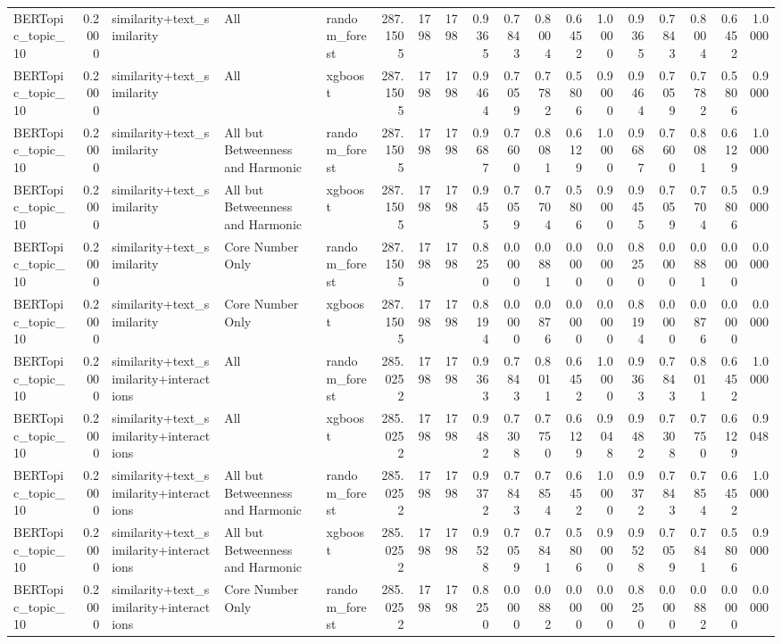 \begin{tabular}{lrlllrrrrrrrrrrrrr}
BERTopic_topic_10 & 0.2000 & similarity+text_similarity & All & random_forest & 287.1505 & 1798 & 1798 & 0.9365 & 0.7843 & 0.8004 & 0.6452 & 1.0000 & 0.9365 & 0.7843 & 0.8004 & 0.6452 & 1.0000 \\
BERTopic_topic_10 & 0.2000 & similarity+text_similarity & All & xgboost & 287.1505 & 1798 & 1798 & 0.9464 & 0.7059 & 0.7782 & 0.5806 & 0.9000 & 0.9464 & 0.7059 & 0.7782 & 0.5806 & 0.9000 \\
BERTopic_topic_10 & 0.2000 & similarity+text_similarity & All but Betweenness and Harmonic & random_forest & 287.1505 & 1798 & 1798 & 0.9687 & 0.7600 & 0.8081 & 0.6129 & 1.0000 & 0.9687 & 0.7600 & 0.8081 & 0.6129 & 1.0000 \\
BERTopic_topic_10 & 0.2000 & similarity+text_similarity & All but Betweenness and Harmonic & xgboost & 287.1505 & 1798 & 1798 & 0.9455 & 0.7059 & 0.7704 & 0.5806 & 0.9000 & 0.9455 & 0.7059 & 0.7704 & 0.5806 & 0.9000 \\
BERTopic_topic_10 & 0.2000 & similarity+text_similarity & Core Number Only & random_forest & 287.1505 & 1798 & 1798 & 0.8250 & 0.0000 & 0.0881 & 0.0000 & 0.0000 & 0.8250 & 0.0000 & 0.0881 & 0.0000 & 0.0000 \\
BERTopic_topic_10 & 0.2000 & similarity+text_similarity & Core Number Only & xgboost & 287.1505 & 1798 & 1798 & 0.8194 & 0.0000 & 0.0876 & 0.0000 & 0.0000 & 0.8194 & 0.0000 & 0.0876 & 0.0000 & 0.0000 \\
BERTopic_topic_10 & 0.2000 & similarity+text_similarity+interactions & All & random_forest & 285.0252 & 1798 & 1798 & 0.9363 & 0.7843 & 0.8011 & 0.6452 & 1.0000 & 0.9363 & 0.7843 & 0.8011 & 0.6452 & 1.0000 \\
BERTopic_topic_10 & 0.2000 & similarity+text_similarity+interactions & All & xgboost & 285.0252 & 1798 & 1798 & 0.9482 & 0.7308 & 0.7750 & 0.6129 & 0.9048 & 0.9482 & 0.7308 & 0.7750 & 0.6129 & 0.9048 \\
BERTopic_topic_10 & 0.2000 & similarity+text_similarity+interactions & All but Betweenness and Harmonic & random_forest & 285.0252 & 1798 & 1798 & 0.9372 & 0.7843 & 0.7854 & 0.6452 & 1.0000 & 0.9372 & 0.7843 & 0.7854 & 0.6452 & 1.0000 \\
BERTopic_topic_10 & 0.2000 & similarity+text_similarity+interactions & All but Betweenness and Harmonic & xgboost & 285.0252 & 1798 & 1798 & 0.9528 & 0.7059 & 0.7841 & 0.5806 & 0.9000 & 0.9528 & 0.7059 & 0.7841 & 0.5806 & 0.9000 \\
BERTopic_topic_10 & 0.2000 & similarity+text_similarity+interactions & Core Number Only & random_forest & 285.0252 & 1798 & 1798 & 0.8250 & 0.0000 & 0.0882 & 0.0000 & 0.0000 & 0.8250 & 0.0000 & 0.0882 & 0.0000 & 0.0000 \\

\end{tabular}
